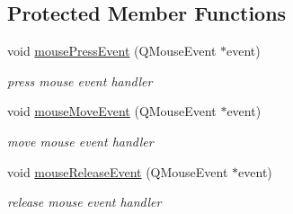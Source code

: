 \subsection*{Protected Member Functions}
\begin{CompactItemize}
\item 
\hypertarget{classImgLabel_20d52d626aa1a1d6cebe3f7e2c33e295}{
void \hyperlink{classImgLabel_20d52d626aa1a1d6cebe3f7e2c33e295}{mousePressEvent} (QMouseEvent $\ast$event)}
\label{classImgLabel_20d52d626aa1a1d6cebe3f7e2c33e295}

\begin{CompactList}\small\item\em press mouse event handler \item\end{CompactList}\item 
\hypertarget{classImgLabel_935514f1ec077f7c817fb057a16d8c4d}{
void \hyperlink{classImgLabel_935514f1ec077f7c817fb057a16d8c4d}{mouseMoveEvent} (QMouseEvent $\ast$event)}
\label{classImgLabel_935514f1ec077f7c817fb057a16d8c4d}

\begin{CompactList}\small\item\em move mouse event handler \item\end{CompactList}\item 
\hypertarget{classImgLabel_ccc9e0b19e5e7873a8493f0d7e03c65b}{
void \hyperlink{classImgLabel_ccc9e0b19e5e7873a8493f0d7e03c65b}{mouseReleaseEvent} (QMouseEvent $\ast$event)}
\label{classImgLabel_ccc9e0b19e5e7873a8493f0d7e03c65b}

\begin{CompactList}\small\item\em release mouse event handler \item\end{CompactList}\end{CompactItemize}
